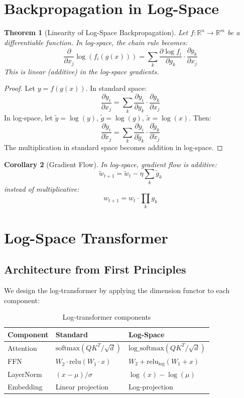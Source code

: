 \documentclass{article}
\newtheorem{theorem}{Theorem}
\newtheorem{corollary}[theorem]{Corollary}
\begin{document}
\section{Backpropagation in Log-Space}

\begin{theorem}[Linearity of Log-Space Backpropagation]\label{thm:backprop}
Let $f: \mathbb{R}^n \to \mathbb{R}^m$ be a differentiable function. In log-space, the chain rule becomes:
\[
\frac{\partial}{\partial x_j} \log(f_i(g(x))) = \sum_k \frac{\partial \log f_i}{\partial g_k} \cdot \frac{\partial g_k}{\partial x_j}
\]
This is linear (additive) in the log-space gradients.
\end{theorem}

\begin{proof}
Let $y = f(g(x))$. In standard space:
\[
\frac{\partial y_i}{\partial x_j} = \sum_k \frac{\partial y_i}{\partial g_k} \cdot \frac{\partial g_k}{\partial x_j}
\]
In log-space, let $\tilde{y} = \log(y)$, $\tilde{g} = \log(g)$, $\tilde{x} = \log(x)$. Then:
\[
\frac{\partial \tilde{y}_i}{\partial \tilde{x}_j} = \sum_k \frac{\partial \tilde{y}_i}{\partial \tilde{g}_k} \cdot \frac{\partial \tilde{g}_k}{\partial \tilde{x}_j}
\]
The multiplication in standard space becomes addition in log-space.
\end{proof}

\begin{corollary}[Gradient Flow]
In log-space, gradient flow is additive:
\[
\tilde{w}_{t+1} = \tilde{w}_t - \eta \sum_k \tilde{g}_k
\]
instead of multiplicative:
\[
w_{t+1} = w_t \cdot \prod_k g_k
\]
\end{corollary}

\section{Log-Space Transformer}

\subsection{Architecture from First Principles}

We design the log-transformer by applying the dimension functor to each component:

\begin{table}[h]
\centering
\caption{Log-transformer components}
\begin{tabular}{@{}lll@{}}
\toprule
\textbf{Component} & \textbf{Standard} & \textbf{Log-Space} \\
\midrule
Attention & $\text{softmax}(QK^T/\sqrt{d})$ & $\text{log\_softmax}(QK^T/\sqrt{d})$ \\
FFN & $W_2 \cdot \text{relu}(W_1 \cdot x)$ & $W_2 + \text{relu}_{\log}(W_1 + x)$ \\
LayerNorm & $(x - \mu) / \sigma$ & $\log(x) - \log(\mu)$ \\
Embedding & Linear projection & Log-projection \\
\bottomrule
\end{tabular}
\end{table}
\end{document}
